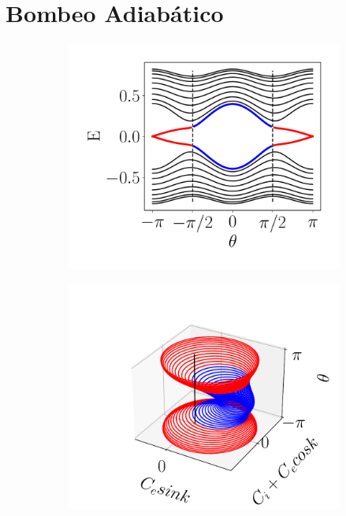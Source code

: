 \section{Bombeo Adiabático}

\begin{figure}[tbh!]
     \centering
    \captionsetup[sub]{font=small}

     \begin{subfigure}[b!]{0.25 \textwidth}
         \caption{}
         \includegraphics[width=\textwidth]{Imagenes/Shh_images/bands_shh_pump.pdf}
     \end{subfigure}\hspace*{-0.9em}
     \begin{subfigure}[b!]{0.25 \textwidth}
         \caption{}
         \includegraphics[width=\textwidth]{Imagenes/Shh_images/loop_pump_ssh.pdf}

\end{subfigure}
\end{figure}
